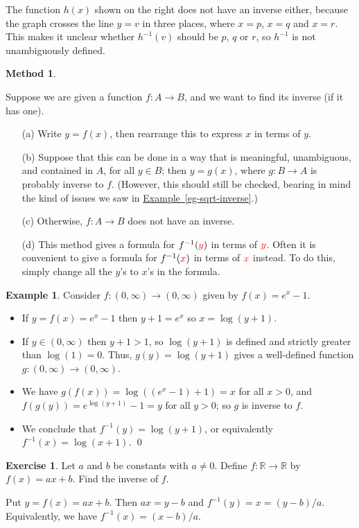 \documentclass[a4paper]{book}
\newcommand{\RED}[1]{{\color{red}#1}}
\newcommand{\R}         {{\mathbb{R}}}
\newcommand{\xra}       {\xrightarrow}
\renewcommand{\:}{\colon}
\newcommand{\bilabel}[1]{\hypertarget{#1}{\label{#1}}}
\newcommand{\biref}[2]{\hyperlink{#2}{#1~\ref*{#2}}}
\theoremstyle{definition}
\newtheorem{example}[theorem]{Example}
\newtheorem{exercise}[theorem]{Exercise}
\newtheorem{method}[theorem]{Method}
\renewenvironment{solution}{\SolutionInline}{\endSolutionInline}
\begin{document}
The function $h(x)$ shown on the right does not have an inverse
either, because the graph crosses the line $y=v$ in three places,
where $x=p$, $x=q$ and $x=r$.  This makes it unclear whether
$h^{-1}(v)$ should be $p$, $q$ or $r$, so $h^{-1}$ is not
unambiguously defined.

\begin{method}\bilabel{alg-inverse}
 Suppose we are given a function $f\:A\xra{}B$, and we want to find
 its inverse (if it has one).
 \begin{itemize}
  \item[(a)] Write $y=f(x)$, then rearrange this to express $x$ in terms of
   $y$.
  \item[(b)] Suppose that this can be done in a way that is
   meaningful, unambiguous, and contained in $A$, for all $y\in B$;
   then $y=g(x)$, where $g\:B\xra{}A$ is probably inverse to $f$.
   (\RED{However}, this should still be checked, bearing in mind the
   kind of issues we saw in \biref{Example}{eg-sqrt-inverse}.)
  \item[(c)] Otherwise, $f\:A\xra{}B$ does not have an inverse.
  \item[(d)] This method gives a formula for $f^{-1}(\RED{y})$ in terms of
   $\RED{y}$.  Often it is convenient to give a formula for
   $f^{-1}(\RED{x})$ in terms of $\RED{x}$ instead.  To do this,
   simply change all the $y$'s to $x$'s in the formula.
 \end{itemize}
\end{method}
\begin{example}
 Consider $f\:(0,\infty)\xra{}(0,\infty)$ given by $f(x)=e^x-1$.
 \begin{itemize}
  \item  If $y=f(x)=e^x-1$ then $y+1=e^x$ so $x=\log(y+1)$.
  \item If $y\in(0,\infty)$ then $y+1>1$, so $\log(y+1)$ is defined
   and strictly greater than $\log(1)=0$.  Thus, $g(y)=\log(y+1)$
   gives a well-defined function $g\:(0,\infty)\xra{}(0,\infty)$.
  \item We have $g(f(x))=\log((e^x-1)+1)=x$ for all $x>0$, and
   $f(g(y))=e^{\log(y+1)}-1=y$ for all $y>0$; so $g$ is inverse to
   $f$.
  \item We conclude that $f^{-1}(y)=\log(y+1)$, or equivalently
   $f^{-1}(x)=\log(x+1)$.  \qed
 \end{itemize}
\end{example}

\begin{exercise}
 Let $a$ and $b$ be constants with $a\neq 0$.  Define $f\:\R\xra{}\R$
 by $f(x)=ax+b$.  Find the inverse of $f$.
\end{exercise}
\begin{solution}
 Put $y=f(x)=ax+b$.  Then $ax=y-b$ and $f^{-1}(y)=x=(y-b)/a$.
 Equivalently, we have $f^{-1}(x)=(x-b)/a$.
\end{solution}
\end{document}

